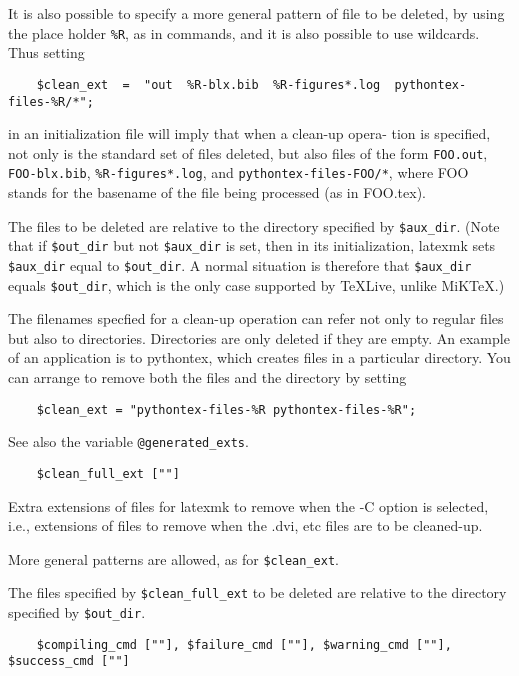 It is also possible to specify a more general pattern of file to
be deleted, by using the place holder \verb|%R|, as in commands, and it
is also possible to use wildcards.  Thus setting

\begin{verbatim}
	$clean_ext  =  "out  %R-blx.bib  %R-figures*.log  pythontex- files-%R/*";
\end{verbatim}

in an initialization file will imply that when a clean-up opera-
tion  is  specified,  not  only  is  the  standard  set of files
deleted, but also files of the form  \verb|FOO.out|,  \verb|FOO-blx.bib|,  
\verb|%R-figures*.log|,  and  \verb|pythontex-files-FOO/*|,  where FOO stands for
the basename of the file being processed (as in FOO.tex).

The files to be deleted are relative to the directory  specified
by  \verb|$aux_dir|.   (Note  that if \verb|$out_dir| but not \verb|$aux_dir| is set,
then in its  initialization,  latexmk  sets  \verb|$aux_dir|  equal  to
\verb|$out_dir|.   A normal situation is therefore that \verb|$aux_dir| equals
\verb|$out_dir|, which is the only case supported  by  TeXLive,  unlike
MiKTeX.)

The  filenames  specfied  for a clean-up operation can refer not
only to regular files but also to directories.  Directories  are
only deleted if they are empty.  An example of an application is
to pythontex, which creates files  in  a  particular  directory.
You  can  arrange  to remove both the files and the directory by
setting

\begin{verbatim}
	$clean_ext = "pythontex-files-%R pythontex-files-%R";
\end{verbatim}

See also the variable \verb|@generated_exts|.

\begin{verbatim}
	$clean_full_ext [""]
\end{verbatim}

Extra extensions of files for latexmk to remove when the -C  option  is
selected, i.e., extensions of files to remove when the .dvi, etc files are to
be cleaned-up.

More general patterns are allowed, as for \verb|$clean_ext|.

The files specified by \verb|$clean_full_ext| to be deleted  are  relative to the
directory specified by \verb|$out_dir|.


\begin{verbatim}
	$compiling_cmd [""], $failure_cmd [""], $warning_cmd [""], $success_cmd [""]
\end{verbatim}

